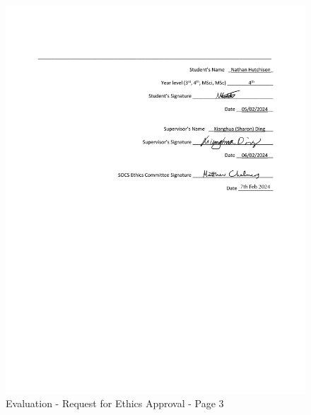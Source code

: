 \documentclass{l4proj}
\begin{document}
\begin{figure}[h!]
    \centering
    \includegraphics[width=1\linewidth]{dissertation//dissImages/RequestforEthicsApprovalpage3.pdf}
    \caption{Evaluation - Request for Ethics Approval - Page 3}
\end{figure}
\end{document}
